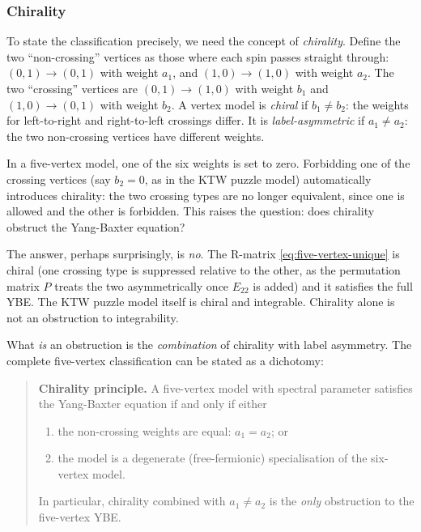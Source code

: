 \subsubsection*{Chirality}

To state the classification precisely, we need the concept of
\emph{chirality}.  Define the two ``non-crossing'' vertices as those
where each spin passes straight through: $(0,1) \to (0,1)$ with
weight $a_1$, and $(1,0) \to (1,0)$ with weight $a_2$.  The two
``crossing'' vertices are $(0,1) \to (1,0)$ with weight $b_1$ and
$(1,0) \to (0,1)$ with weight $b_2$.  A vertex model is
\emph{chiral} if $b_1 \neq b_2$: the weights for left-to-right and
right-to-left crossings differ.  It is \emph{label-asymmetric} if
$a_1 \neq a_2$: the two non-crossing vertices have different weights.

In a five-vertex model, one of the six weights is set to zero.
Forbidding one of the crossing vertices (say $b_2 = 0$, as in the KTW
puzzle model) automatically introduces chirality: the two crossing
types are no longer equivalent, since one is allowed and the other is
forbidden.  This raises the question: does chirality obstruct the
Yang-Baxter equation?

The answer, perhaps surprisingly, is \emph{no}.  The R-matrix
\eqref{eq:five-vertex-unique} is chiral (one crossing type is
suppressed relative to the other, as the permutation matrix $P$ treats
the two asymmetrically once $E_{22}$ is added) and it satisfies the
full YBE.  The KTW puzzle model itself is chiral and integrable.
Chirality alone is not an obstruction to integrability.

What \emph{is} an obstruction is the \emph{combination} of chirality
with label asymmetry.  The complete five-vertex classification can be
stated as a dichotomy:

\begin{quote}
\textbf{Chirality principle.}  A five-vertex model with spectral
parameter satisfies the Yang-Baxter equation if and only if either
\begin{enumerate}
\item[(a)] the non-crossing weights are equal: $a_1 = a_2$; or
\item[(b)] the model is a degenerate (free-fermionic) specialisation
  of the six-vertex model.
\end{enumerate}
In particular, chirality combined with $a_1 \neq a_2$ is the
\emph{only} obstruction to the five-vertex YBE.
\end{quote}

